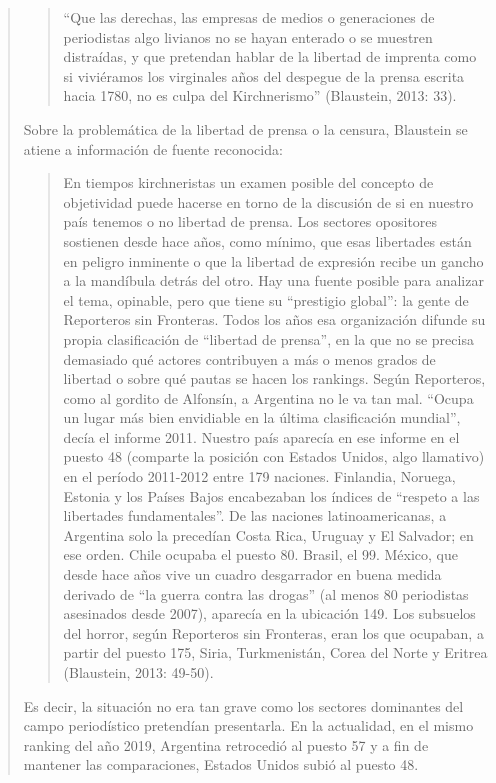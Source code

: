 \begin{quote}
\begin{quote}
	\enquote{Que las derechas, las empresas de medios o generaciones de periodistas algo livianos no se hayan enterado o se muestren distraídas, y que pretendan hablar de la libertad de imprenta como si viviéramos los virginales años del despegue de la prensa escrita hacia 1780, no es culpa del Kirchnerismo} (Blaustein, 2013: 33).
\end{quote}


Sobre la problemática de la libertad de prensa o la censura, Blaustein se atiene a información de fuente reconocida:

\begin{quote}
	En tiempos kirchneristas un examen posible del concepto de objetividad puede hacerse en torno de la discusión de si en nuestro país tenemos o no libertad de prensa. Los sectores opositores sostienen desde hace años, como mínimo, que esas libertades están en peligro inminente o que la libertad de expresión recibe un gancho a la mandíbula detrás del otro. Hay una fuente posible para analizar el tema, opinable, pero que tiene su ``prestigio global'': la gente de Reporteros sin Fronteras. Todos los años esa organización difunde su propia clasificación de ``libertad de prensa'', en la que no se precisa demasiado qué actores contribuyen a más o menos grados de libertad o sobre qué pautas se hacen los rankings. Según Reporteros, como al gordito de Alfonsín, a Argentina no le va tan mal. ``Ocupa un lugar más bien envidiable en la última clasificación mundial'', decía el informe 2011. Nuestro país aparecía en ese informe en el puesto 48 (comparte la posición con Estados Unidos, algo llamativo) en el período 2011-2012 entre 179 naciones. Finlandia, Noruega, Estonia y los Países Bajos encabezaban los índices de ``respeto a las libertades fundamentales''. De las naciones latinoamericanas, a Argentina solo la precedían Costa Rica, Uruguay y El Salvador; en ese orden. Chile ocupaba el puesto 80. Brasil, el 99. México, que desde hace años vive un cuadro desgarrador en buena medida derivado de ``la guerra contra las drogas'' (al menos 80 periodistas asesinados desde 2007), aparecía en la ubicación 149. Los subsuelos del horror\textquotesingle, según Reporteros sin Fronteras, eran los que ocupaban, a partir del puesto 175, Siria, Turkmenistán, Corea del Norte y Eritrea (Blaustein, 2013: 49-50).
\end{quote}


Es decir, la situación no era tan grave como los sectores dominantes del campo periodístico pretendían presentarla. En la actualidad, en el mismo ranking del año 2019, Argentina retrocedió al puesto 57 y a fin de mantener las comparaciones, Estados Unidos subió al puesto 48.


\end{quote}
